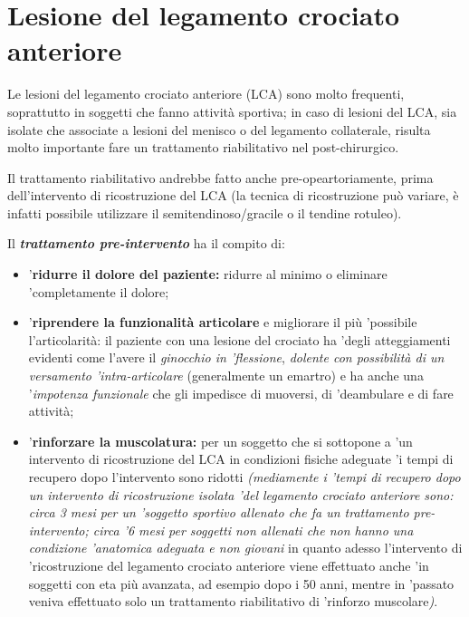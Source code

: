 
\section{Lesione del legamento crociato anteriore}


Le lesioni del legamento crociato anteriore (LCA) sono molto frequenti,
soprattutto in soggetti che fanno attività sportiva; in caso di lesioni
del LCA, sia isolate che associate a lesioni del menisco o del legamento
collaterale, risulta molto importante fare un trattamento riabilitativo
nel post-chirurgico.

Il trattamento riabilitativo andrebbe fatto anche pre-opeartoriamente,
prima dell'intervento di ricostruzione del LCA (la tecnica di
ricostruzione può variare, è infatti possibile utilizzare il
semitendinoso/gracile o il tendine rotuleo).

Il \textbf{\emph{trattamento pre-intervento}} ha il compito di:

\begin{itemize}
 
\item
 '\textbf{ridurre il dolore del paziente:} ridurre al minimo o eliminare
 'completamente il dolore;
\item 
 '\textbf{riprendere la funzionalità articolare} e migliorare il più
 'possibile l'articolarità: il paziente con una lesione del crociato ha
 'degli atteggiamenti evidenti come l'avere il \emph{ginocchio in
 'flessione}, \emph{dolente con possibilità di un versamento
 'intra-articolare} (generalmente un emartro) e ha anche una
 '\emph{impotenza funzionale} che gli impedisce di muoversi, di
 'deambulare e di fare attività;
\item
 '\textbf{rinforzare la muscolatura:} per un soggetto che si sottopone a
 'un intervento di ricostruzione del LCA in condizioni fisiche adeguate
 'i tempi di recupero dopo l'intervento sono ridotti \emph{(mediamente i
 '\emph{tempi di recupero} dopo un intervento di ricostruzione isolata
 'del legamento crociato anteriore sono: circa \emph{3 mesi} per un
 'soggetto sportivo allenato che fa un trattamento pre-intervento; circa
 '\emph{6 mesi} per soggetti non allenati che non hanno una condizione
 'anatomica adeguata e non giovani} in quanto adesso l'intervento di
 'ricostruzione del legamento crociato anteriore viene effettuato anche
 'in soggetti con eta più avanzata, ad esempio dopo i 50 anni, mentre in
 'passato veniva effettuato solo un trattamento riabilitativo di
 'rinforzo muscolare\emph{)}.
\end{itemize}

